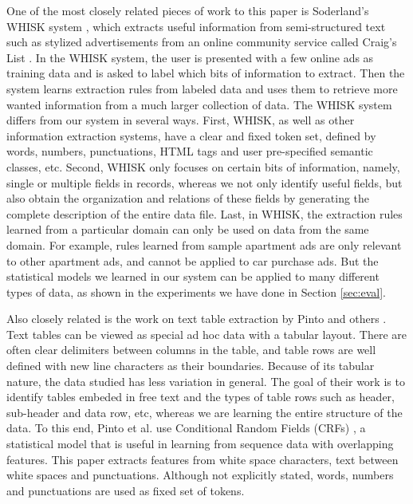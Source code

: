 One of the most closely related pieces of work to this paper is Soderland's WHISK
system \cite{soderland:whisk}, which extracts useful information from
semi-structured text such as stylized advertisements from an online community
service called Craig's List \cite{craigslist}.
In the WHISK system, the user is presented with a few online ads as training data 
and is asked to label which bits of information to extract. Then the system learns
extraction rules from labeled data and uses them to retrieve more wanted
information from a much larger collection of data. 
The WHISK system differs from our system in several ways. 
First, WHISK, as well as other information extraction systems,
have a clear and fixed token set, defined by words, numbers, punctuations, 
HTML tags and user pre-specified semantic classes, etc. 
Second, WHISK only focuses on certain bits of
information, namely, single or multiple fields in records, 
whereas we not only identify useful fields, but also obtain the 
organization and relations of these fields by generating the complete 
description of the entire data file. 
Last, in WHISK, the extraction rules learned from a particular domain can only
be used on data from the same domain. For example, rules learned from sample apartment
ads are only relevant to other apartment ads, and cannot be applied to
car purchase ads. But the statistical models we learned in our system can be
applied to many different types of data, as shown in the experiments we
have done in Section \ref{sec:eval}.  


Also closely related is the work on text table extraction by
Pinto and others \cite{Pinto+:texttables}. Text tables can
be viewed as special ad hoc data with a tabular layout. There are
often clear delimiters between columns in the table, and table rows
are well defined with new line characters as their boundaries.
Because of its tabular nature, the data studied has less variation in general. 
The goal of their work  
is to identify tables embeded in free text and the types of table rows 
such as header, sub-header and data row, etc, whereas we are learning the entire
structure of the data. 
To this end, Pinto et al. use Conditional Random Fields (CRFs) \cite{LaffertyMP01:CRF},
a statistical model that is useful in learning from sequence data with overlapping features.
This paper extracts features from white space characters,
text between white spaces and punctuations. Although not explicitly
stated, words, numbers and punctuations are used as fixed set of tokens. 
 
